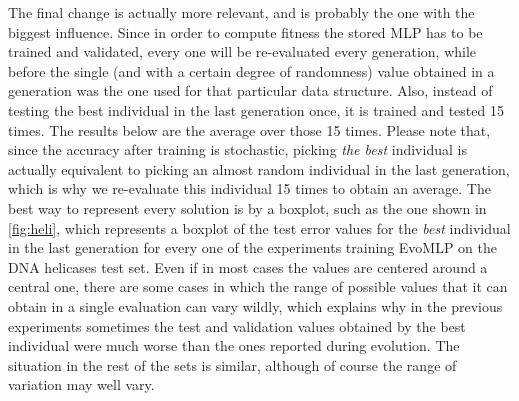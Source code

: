 \documentclass[conference]{IEEEtran}\usepackage[]{graphicx}\usepackage[]{color}
\begin{document}
The final change is actually more relevant, and is probably the one
with the biggest influence. Since in order to compute fitness the
stored MLP has to be trained and validated, every one will be
re-evaluated every generation, while before the single (and with a
certain degree of randomness) value obtained in a generation was the
one used for that particular data structure. Also, instead of testing
the best individual in the last generation once, it is trained and
tested 15 times. The results below are the average over those 15
times. Please note that, since the accuracy after training is
stochastic, picking {\em the best} individual is actually equivalent
to picking an almost random individual in the last generation, which
is why we re-evaluate this individual 15 times to obtain an average.  The best way to represent every solution is by a boxplot, such as the one shown in \autoref{fig:heli}, which represents a boxplot of the test error values for the {\em best} individual in the last generation for every one of the experiments training EvoMLP on the DNA helicases test set. Even if in most cases the values are centered around a central one, there are some cases in which the range of possible values that it can obtain in a single evaluation can vary wildly, which explains why in the previous experiments sometimes the test and validation values obtained by the best individual were much worse than the ones reported during evolution. The situation in the rest of the sets is similar, although of course the range of variation may well vary.
\end{document}
